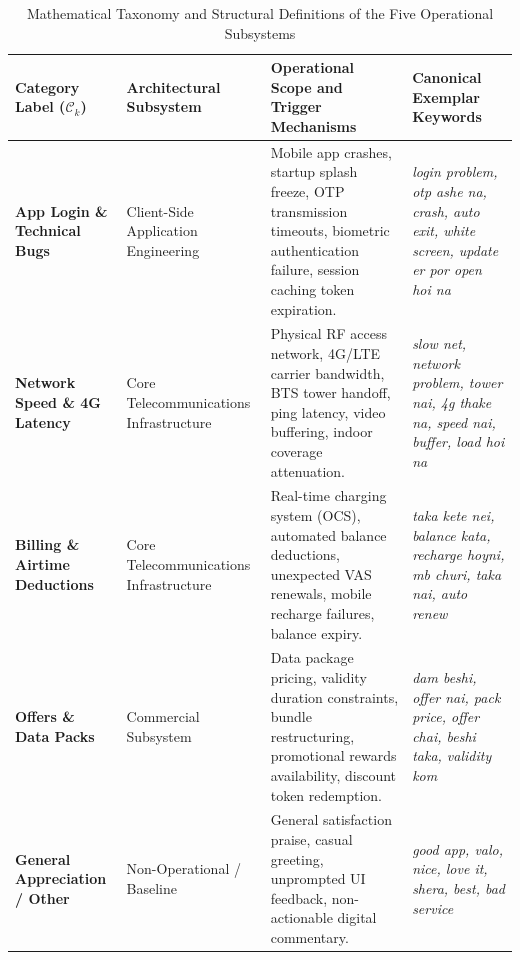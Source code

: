 \documentclass[5p,twocolumn,authoryear]{elsarticle}
\begin{document}
\begin{table}[t]
\centering
\caption{Mathematical Taxonomy and Structural Definitions of the Five Operational Subsystems}
\label{tab:taxonomy}
\footnotesize
\setlength{\tabcolsep}{6pt}
\begin{tabularx}{\textwidth}{@{}lp{3.8cm}p{5.5cm}X@{}}
\toprule
Category Label ($\mathcal{C}_k$) & Architectural Subsystem & Operational Scope and Trigger Mechanisms & Canonical Exemplar Keywords \\
\midrule
\textbf{App Login \& Technical Bugs} & Client-Side Application Engineering & Mobile app crashes, startup splash freeze, OTP transmission timeouts, biometric authentication failure, session caching token expiration. & \textit{login problem, otp ashe na, crash, auto exit, white screen, update er por open hoi na} \\
\addlinespace
\textbf{Network Speed \& 4G Latency} & Core Telecommunications Infrastructure & Physical RF access network, 4G/LTE carrier bandwidth, BTS tower handoff, ping latency, video buffering, indoor coverage attenuation. & \textit{slow net, network problem, tower nai, 4g thake na, speed nai, buffer, load hoi na} \\
\addlinespace
\textbf{Billing \& Airtime Deductions} & Core Telecommunications Infrastructure & Real-time charging system (OCS), automated balance deductions, unexpected VAS renewals, mobile recharge failures, balance expiry. & \textit{taka kete nei, balance kata, recharge hoyni, mb churi, taka nai, auto renew} \\
\addlinespace
\textbf{Offers \& Data Packs} & Commercial Subsystem & Data package pricing, validity duration constraints, bundle restructuring, promotional rewards availability, discount token redemption. & \textit{dam beshi, offer nai, pack price, offer chai, beshi taka, validity kom} \\
\addlinespace
\textbf{General Appreciation / Other} & Non-Operational / Baseline & General satisfaction praise, casual greeting, unprompted UI feedback, non-actionable digital commentary. & \textit{good app, valo, nice, love it, shera, best, bad service} \\
\bottomrule
\end{tabularx}
\end{table}
\end{document}
